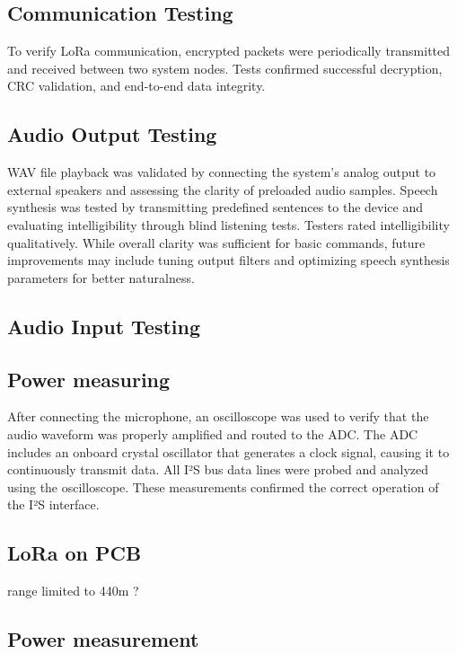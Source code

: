 \documentclass[conference]{IEEEtran}
\begin{document}
\subsection{Communication Testing}
To verify LoRa communication, encrypted packets were periodically transmitted and received between two system nodes. Tests confirmed successful decryption, CRC validation, and end-to-end data integrity.

\subsection{Audio Output Testing}
WAV file playback was validated by connecting the system's analog output to external speakers and assessing the clarity of preloaded audio samples. Speech synthesis was tested by transmitting predefined sentences to the device and evaluating intelligibility through blind listening tests. Testers rated intelligibility qualitatively. While overall clarity was sufficient for basic commands, future improvements may include tuning output filters and optimizing speech synthesis parameters for better naturalness.

\subsection{Audio Input Testing}

\subsection{Power measuring}

After connecting the microphone, an oscilloscope was used to verify that the audio waveform was properly amplified and routed to the ADC.
The ADC includes an onboard crystal oscillator that generates a clock signal, causing it to continuously transmit data.
All I²S bus data lines were probed and analyzed using the oscilloscope.
These measurements confirmed the correct operation of the I²S interface.

\subsection{LoRa on PCB}

range limited to 440m ?

\subsection{Power measurement}
\end{document}
